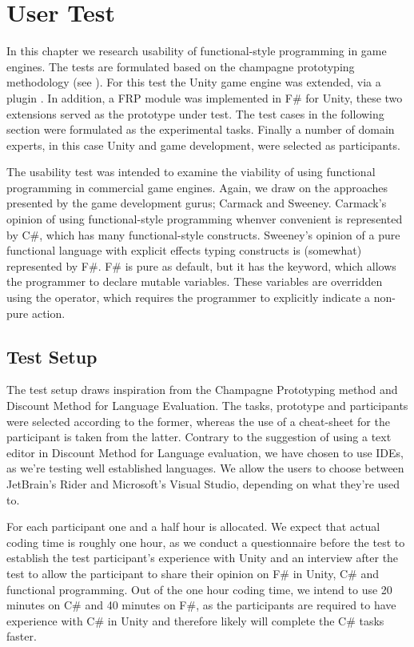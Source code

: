 \chapter{User Test}
In this chapter we research usability of functional-style programming in game engines. The tests are formulated based on the champagne prototyping methodology (see ). For this test the Unity game engine was extended, via a plugin \cite{fsharp2019plugin}. In addition, a \gls{FRP} module was implemented in F\# for Unity, these two extensions served as the prototype under test. The test cases in the following section were formulated as the experimental tasks. Finally a number of domain experts, in this case Unity and game development, were selected as participants. 

The usability test was intended to examine the viability of using functional programming in commercial game engines. Again, we draw on the approaches presented by the game development gurus; Carmack and Sweeney. Carmack's opinion of using functional-style programming whenver convenient is represented by C\#, which has many functional-style constructs. Sweeney's opinion of a pure functional language with explicit effects typing constructs is (somewhat) represented by F\#. F\# is pure as default, but it has the  keyword, which allows the programmer to declare mutable variables. These variables are overridden using the \ttt{\textless-} operator, which requires the programmer to explicitly indicate a non-pure action.
 
\section{Test Setup}
The test setup draws inspiration from the Champagne Prototyping method and Discount Method for Language Evaluation. The tasks, prototype and participants were selected according to the former, whereas the use of a cheat-sheet for the participant is taken from the latter. Contrary to the suggestion of using a text editor in Discount Method for Language evaluation, we have chosen to use \glspl{IDE}, as we're testing well established languages. We allow the users to choose between JetBrain's Rider and Microsoft's Visual Studio, depending on what they're used to.

For each participant one and a half hour is allocated. We expect that actual coding time is roughly one hour, as we conduct a questionnaire before the test to establish the test participant's experience with Unity and an interview after the test to allow the participant to share their opinion on F\# in Unity, C\# and functional programming. Out of the one hour coding time, we intend to use 20 minutes on C\# and 40 minutes on F\#, as the participants are required to have experience with C\# in Unity and therefore likely will complete the C\# tasks faster.

